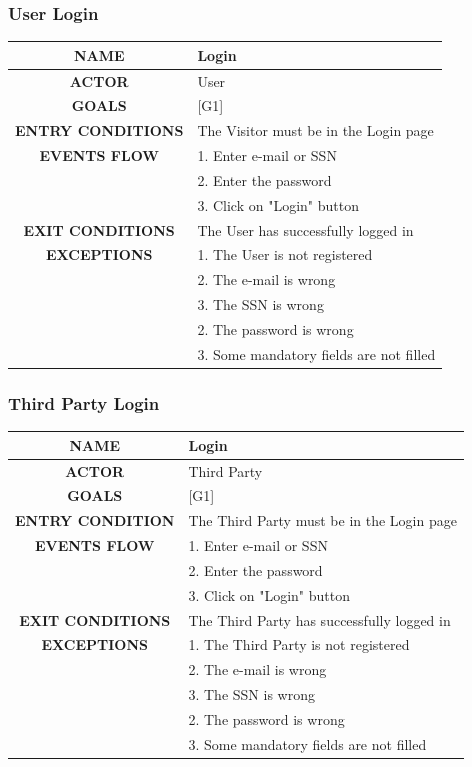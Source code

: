 \documentclass[12pt,a4paper]{article}
\begin{document}
	\subsubsection{User Login }
	\begin{center}
		\begin{tabular}{| c | l |}
			\hline
			\textbf{NAME} & Login \\
			\hline
			\textbf{ACTOR} & User \\
			\hline
			\textbf{GOALS} & [G1] \\
			\hline
			\textbf{ENTRY CONDITIONS} & The Visitor must be in the Login page \\ \hline
			\textbf{EVENTS FLOW}  &
			1. Enter e-mail or SSN\\
			&2. Enter the password\\
			&3. Click on "Login" button\\
			\hline
			\textbf{EXIT CONDITIONS}  & The User has successfully logged in \\ \hline
			\textbf{EXCEPTIONS} & 
			1. The User is not registered\\
			&2. The e-mail is wrong\\
			&3. The SSN is wrong\\
			&2. The password is wrong\\
			&3. Some mandatory fields are not filled\\
			\hline
		\end{tabular}
	\end{center}

	\subsubsection{Third Party Login}
	\begin{center}
		\begin{tabular}{| c | l |}
			\hline
			\textbf{NAME} & Login \\
			\hline
			\textbf{ACTOR} & Third Party \\
			\hline
			\textbf{GOALS} & [G1] \\
			\hline
			\textbf{ENTRY CONDITION} & The Third Party must be in the Login page \\ \hline
			\textbf{EVENTS FLOW}  &
			1. Enter e-mail or SSN\\
			&2. Enter the password\\
			&3. Click on "Login" button\\
			\hline
			\textbf{EXIT CONDITIONS}  & The Third Party has successfully logged in \\ \hline
			\textbf{EXCEPTIONS} & 
			1. The Third Party is not registered\\
			&2. The e-mail is wrong\\
			&3. The SSN is wrong\\
			&2. The password is wrong\\
			&3. Some mandatory fields are not filled\\
			\hline
		\end{tabular}
	\end{center}
\end{document}
